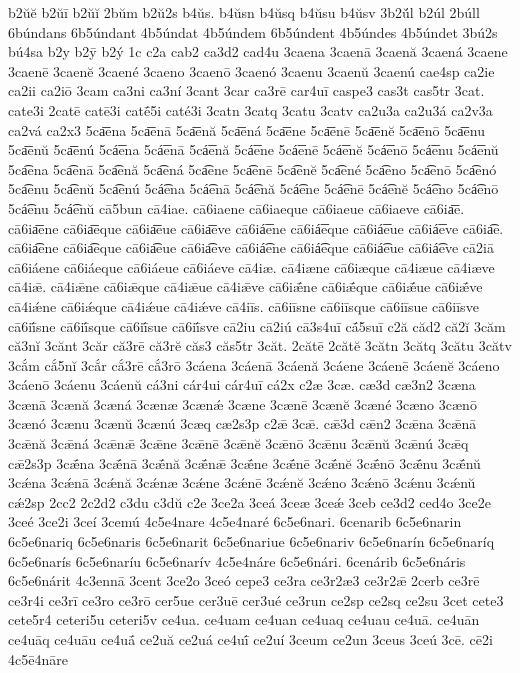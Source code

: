 {b2ŭĕ
b2ŭī
b2ŭĭ
2bŭm
b2ŭ2s
b4ŭs.
b4ŭsn
b4ŭsq
b4ŭsu
b4ŭsv
3b2ŭ́l
b2úl
2búll
6búndans
6b5úndant
4b5úndat
4b5úndem
6b5úndent
4b5úndes
4b5úndet
3bú2s
bú4sa
b2y
b2ȳ
b2ý
1c
c2a
cab2
ca3d2
cad4u
3caena
3caenā
3caenă
3caená
3caene
3caenē
3caenĕ
3caené
3caeno
3caenō
3caenó
3caenu
3caenŭ
3caenú
cae4sp
ca2ie
ca2ii
ca2iō
3cam
ca3ni
ca3ní
3cant
3car
ca3rē
car4uī
caspe3
cas3t
cas5tr
3cat.
cate3i
2catē
catē3i
catḗ5i
caté3i
3catn
3catq
3catu
3catv
ca2u3a
ca2u3á
ca2v3a
ca2vá
ca2x3
5ca͞ena
5ca͞enā
5ca͞enă
5ca͞ená
5ca͞ene
5ca͞enē
5ca͞enĕ
5ca͞enō
5ca͞enu
5ca͞enŭ
5ca͞enú
5cá͞ena
5cá͞enā
5cá͞enă
5cá͞ene
5cá͞enē
5cá͞enĕ
5cá͞enō
5cá͞enu
5cá͞enŭ
5ca͡ena
5ca͡enā
5ca͡enă
5ca͡ená
5ca͡ene
5ca͡enē
5ca͡enĕ
5ca͡ené
5ca͡eno
5ca͡enō
5ca͡enó
5ca͡enu
5ca͡enŭ
5ca͡enú
5cá͡ena
5cá͡enā
5cá͡enă
5cá͡ene
5cá͡enē
5cá͡enĕ
5cá͡eno
5cá͡enō
5cá͡enu
5cá͡enŭ
cā5bun
cā4iae.
cā6iaene
cā6iaeque
cā6iaeue
cā6iaeve
cā6ia͞e.
cā6ia͞ene
cā6ia͞eque
cā6ia͞eue
cā6ia͞eve
cā6iá͞ene
cā6iá͞eque
cā6iá͞eue
cā6iá͞eve
cā6ia͡e.
cā6ia͡ene
cā6ia͡eque
cā6ia͡eue
cā6ia͡eve
cā6iá͡ene
cā6iá͡eque
cā6iá͡eue
cā6iá͡eve
cā2iā
cā6iáene
cā6iáeque
cā6iáeue
cā6iáeve
cā4iæ.
cā4iæne
cā6iæque
cā4iæue
cā4iæve
cā4iǣ.
cā4iǣne
cā6iǣque
cā4iǣue
cā4iǣve
cā6iǣ́ne
cā6iǣ́que
cā6iǣ́ue
cā6iǣ́ve
cā4iǽne
cā6iǽque
cā4iǽue
cā4iǽve
cā4iīs.
cā6iīsne
cā6iīsque
cā6iīsue
cā6iīsve
cā6iī́sne
cā6iī́sque
cā6iī́sue
cā6iī́sve
cā2iu
cā2iú
cā3s4uī
cā́5suī
c2ă
căd2
că2ĭ
3căm
că3nĭ
3cănt
3căr
că3rē
că3rĕ
căs3
căs5tr
3căt.
2cătē
2cătĕ
3cătn
3cătq
3cătu
3cătv
3cắm
cắ5nĭ
3cắr
cắ3rē
cắ3rō
3cáena
3cáenā
3cáenă
3cáene
3cáenē
3cáenĕ
3cáeno
3cáenō
3cáenu
3cáenŭ
cá3ni
cár4ui
cár4uī
cá2x
c2æ
3cæ.
cæ3d
cæ3n2
3cæna
3cænā
3cænă
3cæná
3cænæ
3cænǽ
3cæne
3cænē
3cænĕ
3cæné
3cæno
3cænō
3cænó
3cænu
3cænŭ
3cænú
3cæq
cæ2s3p
c2ǣ
3cǣ.
cǣ3d
cǣn2
3cǣna
3cǣnā
3cǣnă
3cǣná
3cǣnǣ
3cǣne
3cǣnē
3cǣnĕ
3cǣnō
3cǣnu
3cǣnŭ
3cǣnú
3cǣq
cǣ2s3p
3cǣ́na
3cǣ́nā
3cǣ́nă
3cǣ́nǣ
3cǣ́ne
3cǣ́nē
3cǣ́nĕ
3cǣ́nō
3cǣ́nu
3cǣ́nŭ
3cǽna
3cǽnā
3cǽnă
3cǽnæ
3cǽne
3cǽnē
3cǽnĕ
3cǽno
3cǽnō
3cǽnu
3cǽnŭ
cǽ2sp
2cc2
2c2d2
c3du
c3dŭ
c2e
3ce2a
3ceá
3ceæ
3ceǽ
3ceb
ce3d2
ced4o
3ce2e
3ceé
3ce2i
3ceí
3cemú
4c5e4nare
4c5e4naré
6c5e6nari.
6cenarib
6c5e6narin
6c5e6nariq
6c5e6naris
6c5e6narit
6c5e6nariue
6c5e6nariv
6c5e6narín
6c5e6naríq
6c5e6narís
6c5e6naríu
6c5e6narív
4c5e4náre
6c5e6nári.
6cenárib
6c5e6náris
6c5e6nárit
4c3ennā
3cent
3ce2o
3ceó
cepe3
ce3ra
ce3r2æ3
ce3r2ǣ
2cerb
ce3rē
ce3r4i
ce3rī
ce3ro
ce3rō
cer5ue
cer3uē
cer3ué
ce3run
ce2sp
ce2sq
ce2su
3cet
cete3
cete5r4
ceteri5u
ceteri5v
ce4ua.
ce4uam
ce4uan
ce4uaq
ce4uau
ce4uā.
ce4uān
ce4uāq
ce4uāu
ce4uā́
ce2uă
ce2uá
ce4uī́
ce2uí
3ceum
ce2un
3ceus
3ceú
3cē.
cē2i
4c5ē4nāre
}
